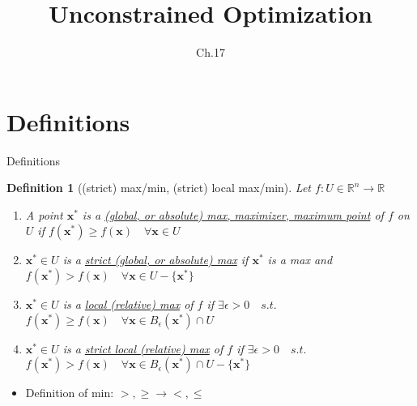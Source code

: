 \documentclass[final]{beamer}
\author[조남운]{\mail}
\title{Unconstrained Optimization}
\subtitle{Ch.17}
\newtheorem{defn}{Definition}
\newcommand{\bb}{\mathbb}
\newcommand{\bd}{\mathbf}
\begin{document}
\maketitle


\section{Definitions} %
\label{sec:definitions}
\begin{frame}[t]{Definitions}
	\begin{defn}
		[(strict) max/min, (strict) local max/min]
		Let $f:U\in \bb{R}^n\rightarrow \bb{R}$
		\begin{enumerate}
			\item A point $\bd{x}^\ast$ is a \uline{(global, or absolute) max, maximizer, maximum point} of $f$ on $U$ if $f(\bd{x^\ast})\ge f(\bd{x})\quad\forall \bd{x}\in U$
			\item $\bd{x^\ast}\in U$ is a \uline{strict (global, or absolute) max} if $\bd{x^\ast}$ is a max and $f(\bd{x^\ast})>f(\bd{x})\quad\forall \bd{x}\in U-\{\bd{x^\ast}\}$
			\item $\bd{x^\ast}\in U$ is a \uline{local (relative) max} of $f$ if $\exists \epsilon>0 \quad s.t.$ $f(\bd{x^\ast})\ge f(\bd{x})\quad\forall \bd{x}\in B_\epsilon(\bd{x^\ast})\cap U$
			\item $\bd{x^\ast}\in U$ is a \uline{strict local (relative) max} of $f$ if $\exists \epsilon>0 \quad s.t.$ $f(\bd{x^\ast})> f(\bd{x})\quad\forall \bd{x}\in B_\epsilon(\bd{x^\ast})\cap U-\{\bd{x^\ast}\}$
		\end{enumerate}
	\end{defn}
	\begin{itemize}
		\item Definition of min: $>,\ge \rightarrow <, \le$
	\end{itemize}
\end{frame}
\end{document}
